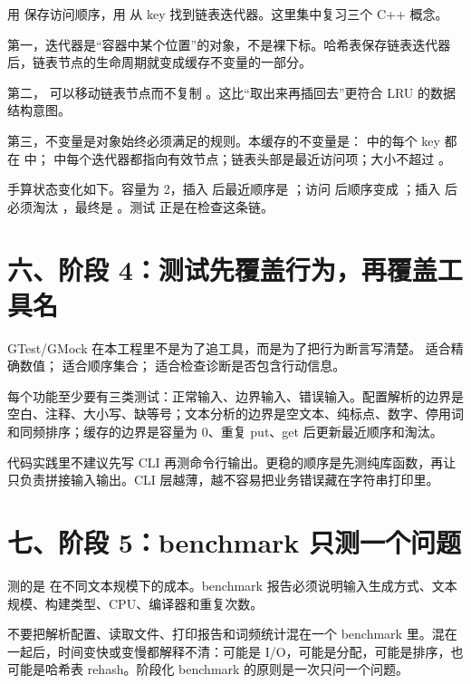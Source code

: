  用  保存访问顺序，用  从 key 找到链表迭代器。这里集中复习三个 C++ 概念。

第一，迭代器是“容器中某个位置”的对象，不是裸下标。哈希表保存链表迭代器后，链表节点的生命周期就变成缓存不变量的一部分。

第二， 可以移动链表节点而不复制 。这比“取出来再插回去”更符合 LRU 的数据结构意图。

第三，不变量是对象始终必须满足的规则。本缓存的不变量是： 中的每个 key 都在  中； 中每个迭代器都指向有效节点；链表头部是最近访问项；大小不超过 。

手算状态变化如下。容量为 2，插入  后最近顺序是 ；访问  后顺序变成 ；插入  后必须淘汰 ，最终是 。测试  正是在检查这条链。

\section{六、阶段 4：测试先覆盖行为，再覆盖工具名}

GTest/GMock 在本工程里不是为了追工具，而是为了把行为断言写清楚。 适合精确数值； 适合顺序集合； 适合检查诊断是否包含行动信息。

每个功能至少要有三类测试：正常输入、边界输入、错误输入。配置解析的边界是空白、注释、大小写、缺等号；文本分析的边界是空文本、纯标点、数字、停用词和同频排序；缓存的边界是容量为 0、重复 put、get 后更新最近顺序和淘汰。

代码实践里不建议先写 CLI 再测命令行输出。更稳的顺序是先测纯库函数，再让  只负责拼接输入输出。CLI 层越薄，越不容易把业务错误藏在字符串打印里。

\section{七、阶段 5：benchmark 只测一个问题}

 测的是  在不同文本规模下的成本。benchmark 报告必须说明输入生成方式、文本规模、构建类型、CPU、编译器和重复次数。

不要把解析配置、读取文件、打印报告和词频统计混在一个 benchmark 里。混在一起后，时间变快或变慢都解释不清：可能是 I/O，可能是分配，可能是排序，也可能是哈希表 rehash。阶段化 benchmark 的原则是一次只问一个问题。

